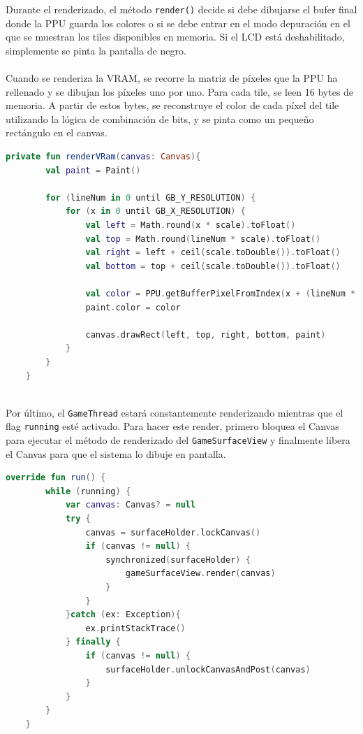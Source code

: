 Durante el renderizado, el método \texttt{render()} decide si debe dibujarse el bufer final donde la PPU guarda los colores o si se debe entrar en el modo depuración en el que se muestran los tiles disponibles en memoria. Si el LCD está deshabilitado, simplemente se pinta la pantalla de negro.
\\\\
Cuando se renderiza la VRAM, se recorre la matriz de píxeles que la PPU ha rellenado y se dibujan los píxeles uno por uno. Para cada tile, se leen 16 bytes de memoria. A partir de estos bytes, se reconstruye el color de cada píxel del tile utilizando la lógica de combinación de bits, y se pinta como un pequeño rectángulo en el canvas.

\begin{lstlisting}[language=Kotlin, caption={Medición y Escalado del Canvas.}, label={code:surfaceonmeasure}]
    private fun renderVRam(canvas: Canvas){
        val paint = Paint()

        for (lineNum in 0 until GB_Y_RESOLUTION) {
            for (x in 0 until GB_X_RESOLUTION) {
                val left = Math.round(x * scale).toFloat()
                val top = Math.round(lineNum * scale).toFloat()
                val right = left + ceil(scale.toDouble()).toFloat()
                val bottom = top + ceil(scale.toDouble()).toFloat()

                val color = PPU.getBufferPixelFromIndex(x + (lineNum * GB_X_RESOLUTION))
                paint.color = color

                canvas.drawRect(left, top, right, bottom, paint)
            }
        }
    }
    
\end{lstlisting}

Por último, el \texttt{GameThread} estará constantemente renderizando mientras que el flag \texttt{running} esté activado. Para hacer este render, primero bloquea el Canvas para ejecutar el método de renderizado del \texttt{GameSurfaceView} y finalmente libera el Canvas para que el sistema lo dibuje en pantalla.

\begin{lstlisting}[language=Kotlin, caption={Renderizado en el GameThread.}, label={code:surfacerenderthread}]
    override fun run() {
        while (running) {
            var canvas: Canvas? = null
            try {
                canvas = surfaceHolder.lockCanvas()
                if (canvas != null) {
                    synchronized(surfaceHolder) {
                        gameSurfaceView.render(canvas)
                    }
                }
            }catch (ex: Exception){
                ex.printStackTrace()
            } finally {
                if (canvas != null) {
                    surfaceHolder.unlockCanvasAndPost(canvas)
                }
            }
        }
    }
\end{lstlisting}

